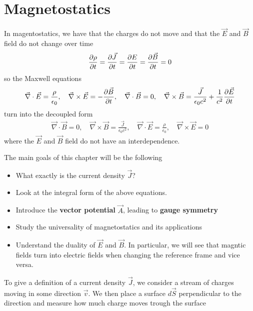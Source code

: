 \section{Magnetostatics}

In magentostatics, we have that the charges do not move and that the $\vec{E}$ and $\vec{B}$ field do not change over time
\begin{align*}
  \frac{\partial \rho}{\partial t} = \frac{\partial \vec{J}}{\partial t} = \frac{\partial E}{\partial t} = \frac{\partial \vec{B}}{\partial t} = 0
\end{align*}
so the Maxwell equations
\begin{align*}
  \vec{\nabla}\cdot \vec{E} = \frac{\rho}{\epsilon_0}, \quad \vec{\nabla} \times \vec{E} = - \frac{\partial \vec{B}}{\partial t}, \quad \vec{\nabla} \cdot \vec{B} = 0, \quad \vec{\nabla} \times \vec{B} = \frac{\vec{J}}{\epsilon_0c^{2}} + \frac{1}{c^{2}} \frac{\partial \vec{E}}{\partial t}
\end{align*}
turn into the decoupled form
\begin{align*}
  \vec{\nabla} \cdot \vec{B} = 0, \quad \vec{\nabla} \times \vec{B} = \frac{\vec{J}}{\epsilon_0 c^{2}}, \quad \vec{\nabla} \cdot \vec{E} = \frac{\rho}{\epsilon_0}, \quad \vec{\nabla}\times \vec{E} = 0
\end{align*}
where the $\vec{E}$ and $\vec{B}$ field do not have an interdependence.


The main goals of this chapter will be the following
\begin{itemize}
  \item What exactly is the current density $\vec{J}$?
  \item Look at the integral form of the above equations.
  \item Introduce the \textbf{vector potential} $\vec{A}$, leading to \textbf{gauge symmetry}
  \item Study the universality of magnetostatics and its applications
  \item Understand the duality of $\vec{E}$ and $\vec{B}$. In particular, we will see that magntic fields turn into electric fields when changing the reference frame and vice versa.
\end{itemize}



To give a definition of a current density $\vec{J}$, we consider a stream of charges moving in some direction $\vec{v}$.
We then place a surface $d \vec{S}$ perpendicular to the direction and measure how much charge moves trough the surface

